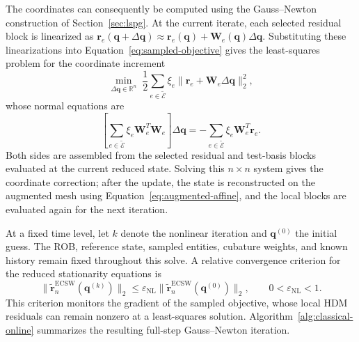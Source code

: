 \documentclass[a4paper,12pt]{article}
\newcommand{\vect}[1]{\boldsymbol{#1}}
\newcommand{\matr}[1]{\boldsymbol{#1}}
\begin{document}
The coordinates can consequently be computed using the Gauss--Newton construction of Section~\ref{sec:lspg}. At the current iterate, each selected residual block is linearized as $\vect{r}_e(\vect{q}+\Delta\vect{q})\approx\vect{r}_e(\vect{q})+\matr{W}_e(\vect{q})\Delta\vect{q}$. Substituting these linearizations into Equation~\eqref{eq:sampled-objective} gives the least-squares problem for the coordinate increment
\begin{equation}
 \underset{\Delta\vect{q}\in\mathbb R^n}{\min}\;
 \frac12\sum_{e\in\widetilde{\mathcal E}}
    \xi_e\|\vect{r}_e+\matr{W}_e\Delta\vect{q}\|_2^2,
\end{equation}
whose normal equations are
\begin{equation}
 \left[\sum_{e\in\widetilde{\mathcal E}}
             \xi_e\matr{W}_e^T\matr{W}_e\right]\Delta\vect{q}
 =-\sum_{e\in\widetilde{\mathcal E}}
             \xi_e\matr{W}_e^T\vect{r}_e.
 \label{eq:classical-gn}
\end{equation}
Both sides are assembled from the selected residual and test-basis blocks evaluated at the current reduced state. Solving this $n\times n$ system gives the coordinate correction; after the update, the state is reconstructed on the augmented mesh using Equation~\eqref{eq:augmented-affine}, and the local blocks are evaluated again for the next iteration.

At a fixed time level, let $k$ denote the nonlinear iteration and $\vect{q}^{(0)}$ the initial guess. The ROB, reference state, sampled entities, cubature weights, and known history remain fixed throughout this solve. A relative convergence criterion for the reduced stationarity equations is
\begin{equation}
 \|\widetilde{\vect{r}}_n^{\mathrm{ECSW}}(\vect{q}^{(k)})\|_2
 \leq\varepsilon_{\mathrm{NL}}
       \|\widetilde{\vect{r}}_n^{\mathrm{ECSW}}(\vect{q}^{(0)})\|_2,
 \qquad 0<\varepsilon_{\mathrm{NL}}<1.
 \label{eq:classical-reduced-stopping}
\end{equation}
This criterion monitors the gradient of the sampled objective, whose local HDM residuals can remain nonzero at a least-squares solution. Algorithm~\ref{alg:classical-online} summarizes the resulting full-step Gauss--Newton iteration.
\end{document}
